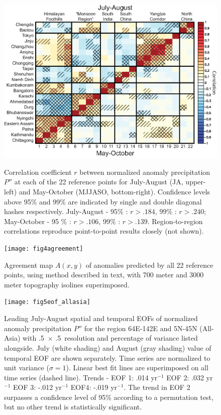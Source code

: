 \documentclass[12pt]{article}
\begin{document}
\begin{figure}[t]
  \noindent\includegraphics[width=36pc,angle=0]{fig3correl}\\
  \caption{Correlation coefficient $r$ between normalized anomaly precipitation $P''$ at each of the 22 reference points for July-August (JA, upper-left) and May-October (MJJASO, bottom-right). Confidence levels above 95\% and 99\% are indicated by single and double diagonal hashes respectively. July-August - 95\% : $r >.184$, 99\% : $r >.240$; May-October - 95 \% : $r>.106$, 99\% : $r >.139$. Region-to-region correlations reproduce point-to-point results closely (not shown).}\label{f3}
\end{figure}

\begin{figure}[t]
  \noindent\texttt{[image: fig4agreement]}\\
  \caption{Agreement map $A(x,y)$ of anomalies predicted by all 22 reference points, using method described in text, with 700 meter and 3000 meter topography isolines superimposed.}\label{f4}
\end{figure}

\begin{figure}[t]
  \noindent\texttt{[image: fig5eof\_allasia]}\\
  \caption{Leading July-August spatial and temporal EOFs of normalized anomaly precipitation $P''$ for the region 64E-142E and 5N-45N (All-Asia) with .5\textdegree\ $\times$ .5\textdegree\ resolution and percentage of variance listed alongside. July (white shading) and August (gray shading) value of temporal EOF are shown separately. Time series are normalized to unit variance ($\sigma=1$). Linear best fit lines are superimposed on all time series (dashed line). Trends - EOF 1: .014 yr$^{-1}$ EOF 2: .032 yr$^{-1}$ EOF 3: -.012 yr$^{-1}$ EOF4: -.019 yr$^{-1}$. The trend in EOF 2 surpasses a confidence level of 95\% according to a permutation test, but no other trend is statistically significant.}\label{f5}
\end{figure}
\end{document}
